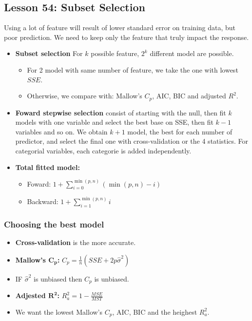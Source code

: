 \documentclass[10pt, french]{article}
\begin{document}
\begin{multicols*}{3}
\section*{Lesson 54: Subset Selection}
Using a lot of feature will result of lower standard error on training data, but poor prediction. We need to keep only the feature that truly impact the response.
\begin{itemize}[align=left,leftmargin=*]
   \item \textbf{Subset selection} For $k$ possible feature, $2^k$ different model are possible.
   \begin{itemize}
    \item For 2 model with same number of feature, we take the one with lowest $SSE$.
    \item Otherwise, we compare with: Mallow's $C_p$, AIC, BIC and adjusted $R^2$.
   \end{itemize}
   \item \textbf{Foward stepwise selection} consist of starting with the null, then fit $k$ models with one variable and select the best base on SSE, then fit $k-1$ variables and so on. We obtain $k+1$ model, the best for each number of predictor, and select the final one with cross-validation or the 4 statistics. For categorial variables, each categorie is added independently.
   \item \textbf{Total fitted model:} 
   \begin{itemize}
      \item Foward: $1 + \sum\limits_{i=0}^{\min(p,n)} (\min(p,n) - i)$ 
      \item Backward: $1 + \sum\limits_{i=1}^{\min(p,n)} i$
   \end{itemize}
\end{itemize}
\subsubsection*{Choosing the best model}
\begin{itemize}
   \item \textbf{Cross-validation} is the more accurate.
   \item \textbf{Mallow's $\mathbf{C_p}$:} $C_p = \frac{1}{n}(SSE + 2p\hat{\sigma}^2)$ 
   \item[] IF $\hat{\sigma}^2$ is unbiased then $C_p$ is unbiased.
   \item \textbf{Adjested $\mathbf{R^2}$:} $R_a^2 = 1 -  \frac{MSE}{MST}$
   \item We want the lowest Mallow's $C_p$, AIC, BIC and the heighest $R_a^2$.
\end{itemize}


\end{multicols*}
\end{document}
